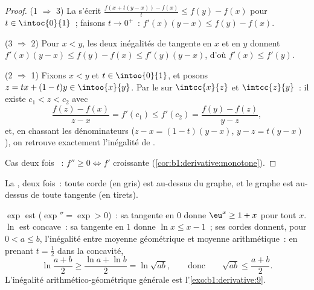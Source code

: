 \begin{proof}
(1 $\Rightarrow$ 3) La  s'écrit $\frac{f(x + t(y-x)) -
f(x)}{t} \leq f(y) - f(x)$ pour $t \in \intoc{0}{1}$~; faisons $t \to 0^+$~:
$f'(x)(y - x) \leq f(y) - f(x)$.

(3 $\Rightarrow$ 2) Pour $x < y$, les deux inégalités de tangente en $x$
et en $y$ donnent $f'(x)(y-x) \leq f(y) - f(x) \leq f'(y)(y - x)$,
d'où $f'(x) \leq f'(y)$.

(2 $\Rightarrow$ 1) Fixons $x < y$ et $t \in \intoo{0}{1}$, et posons $z
= tx + (1-t)y \in \intoo{x}{y}$. Par le  sur
$\intcc{x}{z}$ et $\intcc{z}{y}$~: il existe $c_1 < z < c_2$ avec
\[
\frac{f(z) - f(x)}{z - x} = f'(c_1) \leq f'(c_2)
= \frac{f(y) - f(z)}{y - z} ,
\]
et, en chassant les dénominateurs ($z - x = (1-t)(y-x)$, $y - z = t(y-x)$),
on retrouve exactement l'inégalité de .

Cas deux fois ~: $f'' \geq 0 \iff f'$ croissante
(\cref{cor:b1:derivative:monotone}).
\end{proof}

\begin{omfigure}

{\small La , deux fois~: toute corde (en gris) est au-dessus du
graphe, et le graphe est au-dessus de toute tangente (en tirets).}
\end{omfigure}

\begin{example}\label{ex:b1:derivative:convexineq}
$\exp$ est  ($\exp'' = \exp > 0$)~: sa tangente en $0$ donne
$\eu^x \geq 1 + x$ pour tout $x$. $\ln$ est concave~: sa tangente en $1$
donne $\ln x \leq x - 1$~; ses cordes donnent, pour $0 < a \leq b$,
l'inégalité entre moyenne géométrique et moyenne arithmétique~: en prenant $t =
\frac12$ dans la concavité,
\[
\ln\frac{a + b}{2} \geq \frac{\ln a + \ln b}{2} = \ln\sqrt{ab},
\qquad\text{donc}\qquad
\sqrt{ab} \leq \frac{a+b}{2} .
\]
L'inégalité arithmético-géométrique générale est l'\cref{exo:b1:derivative:9}.
\end{example}

